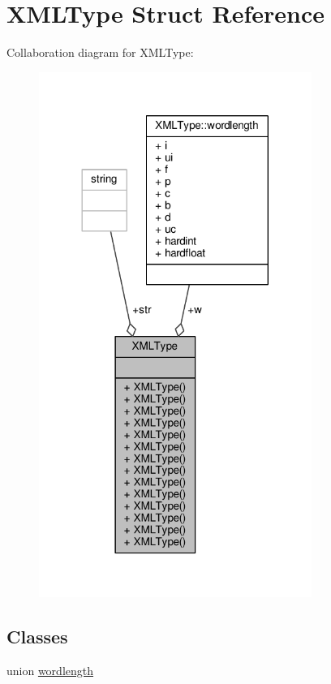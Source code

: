 \hypertarget{structXMLType}{}\section{X\+M\+L\+Type Struct Reference}
\label{structXMLType}


Collaboration diagram for X\+M\+L\+Type\+:
\nopagebreak
\begin{figure}[H]
\begin{center}
\leavevmode
\includegraphics[width=252pt]{d7/d5b/structXMLType__coll__graph}
\end{center}
\end{figure}
\subsection*{Classes}
\begin{DoxyCompactItemize}
\item 
union \hyperlink{unionXMLType_1_1wordlength}{wordlength}
\end{DoxyCompactItemize}

